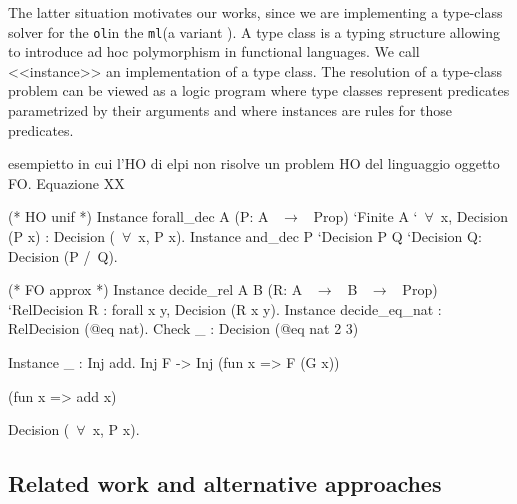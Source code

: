 \documentclass[acmengage]{acmart}
\def\elpi{\proglang{elpi}}
\def\lambdaprolog{\proglang{$\lambda$-prolog}}
\def\coq{\proglang{coq}}
\newcommand*{\acronym}[1]{\texttt{#1}\xspace}
\def\ol{\acronym{ol}} %
\def\ml{\acronym{ml}} %
\newcommand*{\eqtau}{\ensuremath{\mathrel{\overset{\mathrm{\tau}}{=}}}}
\begin{document}
The latter situation motivates our works, since we are implementing a type-class
solver for the \ol \coq in the \ml \elpi (a variant \lambdaprolog). A type class
\cite{wadler89, sozeau08} is a typing structure allowing to introduce ad hoc
polymorphism in functional languages. We call <<instance>> an implementation of
a type class. The resolution of a type-class problem can be viewed as a logic
program where type classes represent predicates parametrized by their arguments
and where instances are rules for those predicates. 





esempietto in cui l'HO di elpi non risolve un problem HO del linguaggio
oggetto FO. Equazione XX


\begin{coqcode}
(* HO unif *)
Instance forall_dec A (P: A ~$\to$~ Prop) `{Finite A} `{~$\forall$~x, Decision (P x)} :
  Decision (~$\forall$~x, P x).
Instance and_dec P `{Decision P} Q `{Decision Q}:  Decision (P /\ Q).



(* FO approx *)
Instance decide_rel A B (R: A ~$\to$~ B ~$\to$~ Prop) `{RelDecision R} :
  forall x y, Decision (R x y).
Instance decide_eq_nat : RelDecision (@eq nat).
Check _ : Decision (@eq nat 2 3)


Instance _ : Inj add.
             Inj F -> Inj (fun x => F (G x))

             (fun x => add x)


  Decision (~$\forall$~x, P x).

\end{coqcode}

\subsection{Related work and alternative approaches}
\end{document}
